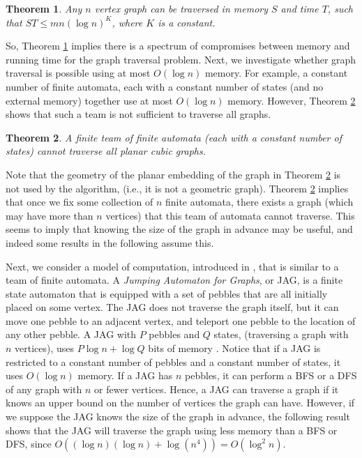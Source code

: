 \documentclass[12pt,letterpaper,oneside]{book}
\newtheorem{theorem}{Theorem}[section]
\begin{document}
\begin{theorem}\label{thmst}
\emph{\cite{F}}  Any $n$ vertex graph can be traversed in memory $S$ 
and time $T$, such that $ST \le mn (\log n)^{K}$, where $K$ is a constant.  
\end{theorem}


So, Theorem \ref{thmst} implies there is a spectrum of compromises between memory and running time for the graph traversal problem.  
Next, we investigate whether graph traversal is possible using at most $O(\log n)$ memory.  For example, 
a constant number of finite automata, each with a constant number of states (and no external memory) together use at most $O(\log n)$ memory.  
However, Theorem \ref{tr} shows that such a team is not sufficient 
to traverse all graphs.     

\begin{theorem}\label{tr}
\emph{\cite{R}} A finite team of finite automata (each with a constant number of states) cannot traverse all planar cubic graphs.  
\end{theorem}


Note that the geometry of the planar embedding of the graph in Theorem \ref{tr} is not used by the 
algorithm, (i.e., it is not a geometric graph).  
Theorem \ref{tr} implies that 
once we fix some collection of $n$ finite automata, there exists a graph (which may have more than $n$ vertices) 
that this 
team of automata cannot traverse.  This seems to imply that knowing the size of the graph in advance may be useful, and indeed 
some results in the following assume this.  

Next, we consider a model of computation, introduced in \cite{CR}, 
that is similar to a team of finite automata.  
A \emph{Jumping Automaton for Graphs}, or JAG, is a finite state automaton 
that is equipped with a set of pebbles that are all initially placed on some vertex.  The JAG does not traverse the graph itself, 
but it can move one pebble to an adjacent vertex, and teleport one pebble to the location of any other pebble.  
A JAG with $P$ pebbles and $Q$ states, (traversing a graph with $n$ vertices), uses 
$P \log n +\log Q$ bits of memory \cite{CR}.  Notice that 
if a JAG is restricted to a constant number of pebbles and a constant number of states, it uses $O(\log n)$ memory. 
If a JAG has $n$ pebbles, it can perform a BFS or a DFS 
of any graph with $n$ or fewer vertices.  Hence, a JAG can traverse a graph if it knows an upper 
bound on the number of vertices the graph can have.  However, if we suppose 
the JAG knows the size of the graph in advance, the following result shows that the JAG will traverse the graph using less memory than 
a BFS or DFS, since $O((\log n)(\log n) + \log (n^4)) = O(\log^2 n) $.  
\end{document}
